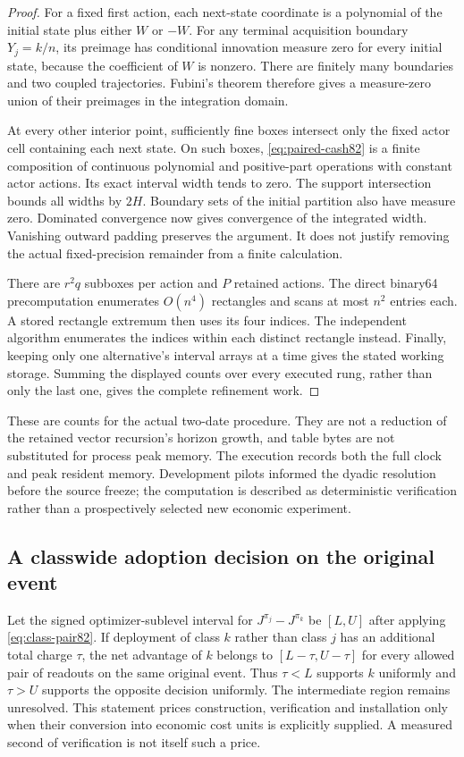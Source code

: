 \begin{proof}
For a fixed first action, each next-state coordinate is a polynomial of the initial state plus either $W$ or $-W$. For any terminal acquisition boundary $Y_j=k/n$, its preimage has conditional innovation measure zero for every initial state, because the coefficient of $W$ is nonzero. There are finitely many boundaries and two coupled trajectories. Fubini's theorem therefore gives a measure-zero union of their preimages in the integration domain.

At every other interior point, sufficiently fine boxes intersect only the fixed actor cell containing each next state. On such boxes, \eqref{eq:paired-cash82} is a finite composition of continuous polynomial and positive-part operations with constant actor actions. Its exact interval width tends to zero. The support intersection bounds all widths by $2H$. Boundary sets of the initial partition also have measure zero. Dominated convergence now gives convergence of the integrated width. Vanishing outward padding preserves the argument. It does not justify removing the actual fixed-precision remainder from a finite calculation.

There are $r^2q$ subboxes per action and $P$ retained actions. The direct binary64 precomputation enumerates $O(n^4)$ rectangles and scans at most $n^2$ entries each. A stored rectangle extremum then uses its four indices. The independent algorithm enumerates the indices within each distinct rectangle instead. Finally, keeping only one alternative's interval arrays at a time gives the stated working storage. Summing the displayed counts over every executed rung, rather than only the last one, gives the complete refinement work.
\end{proof}

These are counts for the actual two-date procedure. They are not a reduction of the retained vector recursion's horizon growth, and table bytes are not substituted for process peak memory. The execution records both the full clock and peak resident memory. Development pilots informed the dyadic resolution before the source freeze; the computation is described as deterministic verification rather than a prospectively selected new economic experiment.

\subsection{A classwide adoption decision on the original event}
Let the signed optimizer-sublevel interval for $J^{\pi_j}-J^{\pi_k}$ be $[L,U]$ after applying \eqref{eq:class-pair82}. If deployment of class $k$ rather than class $j$ has an additional total charge $\tau$, the net advantage of $k$ belongs to $[L-\tau,U-\tau]$ for every allowed pair of readouts on the same original event. Thus $\tau<L$ supports $k$ uniformly and $\tau>U$ supports the opposite decision uniformly. The intermediate region remains unresolved. This statement prices construction, verification and installation only when their conversion into economic cost units is explicitly supplied. A measured second of verification is not itself such a price.

